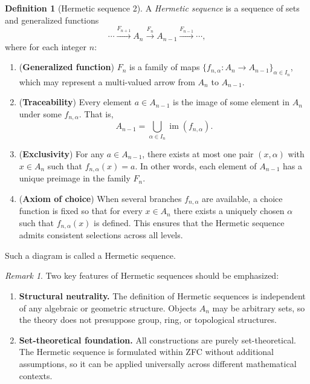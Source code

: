 \documentclass[11pt]{book}
\theoremstyle{definition}
\newtheorem{definition}{Definition}[section]
\theoremstyle{plain}
\theoremstyle{remark}
\newtheorem*{remark}{Remark}
\begin{document}
\begin{definition}[Hermetic sequence 2]
A \emph{Hermetic sequence} is a sequence of sets and generalized functions
\[
\cdots \xrightarrow{F_{n+1}} A_n \xrightarrow{F_n} A_{n-1} \xrightarrow{F_{n-1}} \cdots,
\]
where for each integer $n$:
\begin{enumerate}
    \item (\textbf{Generalized function}) 
    $F_n$ is a family of maps $\{f_{n,\alpha}:A_n\to A_{n-1}\}_{\alpha\in I_n}$, 
    which may represent a multi-valued arrow from $A_n$ to $A_{n-1}$.
    
    \item (\textbf{Traceability}) 
    Every element $a\in A_{n-1}$ is the image of some element in $A_n$ 
    under some $f_{n,\alpha}$. That is,
    \[
    A_{n-1} = \bigcup_{\alpha\in I_n}\operatorname{im}(f_{n,\alpha}).
    \]
    
    \item (\textbf{Exclusivity}) 
    For any $a\in A_{n-1}$, there exists at most one pair $(x,\alpha)$ 
    with $x\in A_n$ such that $f_{n,\alpha}(x)=a$.  
    In other words, each element of $A_{n-1}$ has a unique preimage 
    in the family $F_n$.
    
    \item (\textbf{Axiom of choice}) 
    When several branches $f_{n,\alpha}$ are available, 
    a choice function is fixed so that for every $x\in A_n$ 
    there exists a uniquely chosen $\alpha$ such that 
    $f_{n,\alpha}(x)$ is defined. 
    This ensures that the Hermetic sequence admits consistent selections 
    across all levels.
\end{enumerate}
Such a diagram is called a Hermetic sequence.
\end{definition}

\begin{remark}
Two key features of Hermetic sequences should be emphasized:
\begin{enumerate}
    \item \textbf{Structural neutrality.} 
    The definition of Hermetic sequences is independent of any algebraic or geometric structure. 
    Objects $A_n$ may be arbitrary sets, so the theory does not presuppose group, ring, or topological structures. 
    
    \item \textbf{Set-theoretical foundation.} 
    All constructions are purely set-theoretical. 
    The Hermetic sequence is formulated within ZFC without additional assumptions, 
    so it can be applied universally across different mathematical contexts. 
\end{enumerate}
\end{remark}
\end{document}
